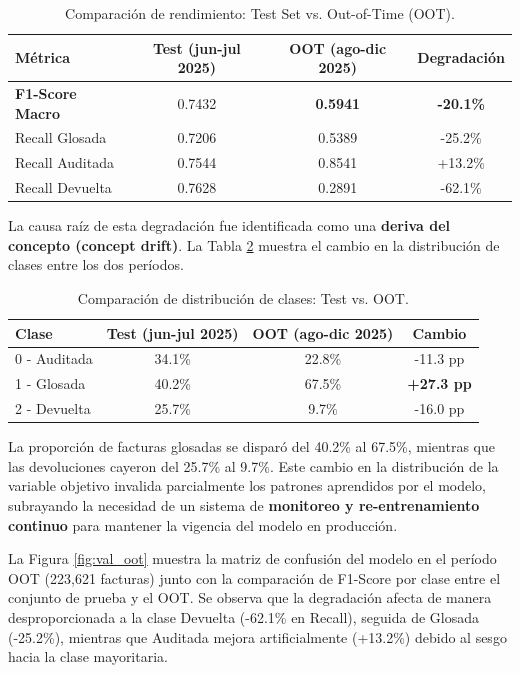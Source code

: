 \documentclass[12pt,letterpaper]{report}
\begin{document}
\begin{table}[H]
\centering
\caption{Comparación de rendimiento: Test Set vs. Out-of-Time (OOT).}
\label{tab:resultados_oot}
\begin{tabular}{@{}lccc@{}}
\toprule
\textbf{Métrica} & \textbf{Test (jun-jul 2025)} & \textbf{OOT (ago-dic 2025)} & \textbf{Degradación} \\
\midrule
\textbf{F1-Score Macro} & 0.7432 & \textbf{0.5941} & \textbf{-20.1\%} \\
Recall Glosada & 0.7206 & 0.5389 & -25.2\% \\
Recall Auditada & 0.7544 & 0.8541 & +13.2\% \\
Recall Devuelta & 0.7628 & 0.2891 & -62.1\% \\
\bottomrule
\end{tabular}
\end{table}

La causa raíz de esta degradación fue identificada como una \textbf{deriva del concepto (concept drift)}. La Tabla \ref{tab:drift_clases} muestra el cambio en la distribución de clases entre los dos períodos.

\begin{table}[H]
\centering
\caption{Comparación de distribución de clases: Test vs. OOT.}
\label{tab:drift_clases}
\begin{tabular}{@{}lccc@{}}
\toprule
\textbf{Clase} & \textbf{Test (jun-jul 2025)} & \textbf{OOT (ago-dic 2025)} & \textbf{Cambio} \\
\midrule
0 - Auditada & 34.1\% & 22.8\% & -11.3 pp \\
1 - Glosada & 40.2\% & 67.5\% & \textbf{+27.3 pp} \\
2 - Devuelta & 25.7\% & 9.7\% & -16.0 pp \\
\bottomrule
\end{tabular}
\end{table}

La proporción de facturas glosadas se disparó del 40.2\% al 67.5\%, mientras que las devoluciones cayeron del 25.7\% al 9.7\%. Este cambio en la distribución de la variable objetivo invalida parcialmente los patrones aprendidos por el modelo, subrayando la necesidad de un sistema de \textbf{monitoreo y re-entrenamiento continuo} para mantener la vigencia del modelo en producción.

La Figura \ref{fig:val_oot} muestra la matriz de confusión del modelo en el período OOT (223,621 facturas) junto con la comparación de F1-Score por clase entre el conjunto de prueba y el OOT. Se observa que la degradación afecta de manera desproporcionada a la clase Devuelta (-62.1\% en Recall), seguida de Glosada (-25.2\%), mientras que Auditada mejora artificialmente (+13.2\%) debido al sesgo hacia la clase mayoritaria.
\end{document}
